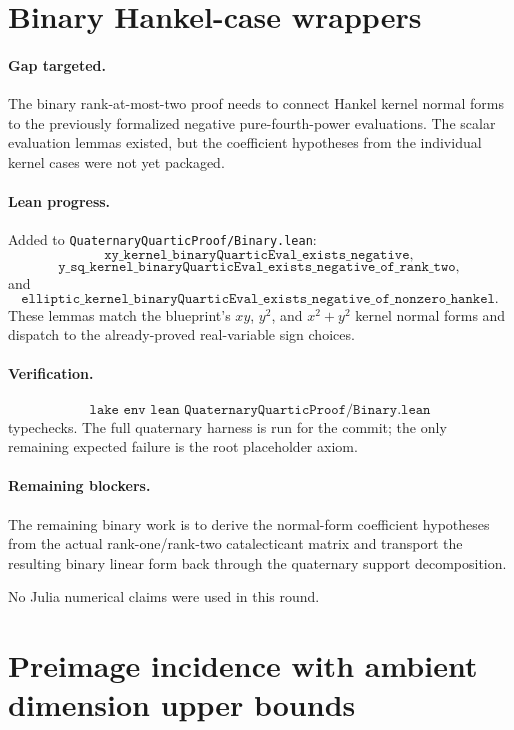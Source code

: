 \documentclass[11pt]{article}
\begin{document}
\section*{Binary Hankel-case wrappers}

\paragraph{Gap targeted.}
The binary rank-at-most-two proof needs to connect Hankel kernel normal forms
to the previously formalized negative pure-fourth-power evaluations.  The
scalar evaluation lemmas existed, but the coefficient hypotheses from the
individual kernel cases were not yet packaged.

\paragraph{Lean progress.}
Added to \texttt{QuaternaryQuarticProof/Binary.lean}:
\[
\texttt{xy\_kernel\_binaryQuarticEval\_exists\_negative},
\]
\[
\texttt{y\_sq\_kernel\_binaryQuarticEval\_exists\_negative\_of\_rank\_two},
\]
and
\[
\texttt{elliptic\_kernel\_binaryQuarticEval\_exists\_negative\_of\_nonzero\_hankel}.
\]
These lemmas match the blueprint's \(xy\), \(y^2\), and \(x^2+y^2\) kernel
normal forms and dispatch to the already-proved real-variable sign choices.

\paragraph{Verification.}
\[
\texttt{lake env lean QuaternaryQuarticProof/Binary.lean}
\]
typechecks.  The full quaternary harness is run for the commit; the only
remaining expected failure is the root placeholder axiom.

\paragraph{Remaining blockers.}
The remaining binary work is to derive the normal-form coefficient hypotheses
from the actual rank-one/rank-two catalecticant matrix and transport the
resulting binary linear form back through the quaternary support decomposition.

No Julia numerical claims were used in this round.

\section*{Preimage incidence with ambient dimension upper bounds}
\end{document}
